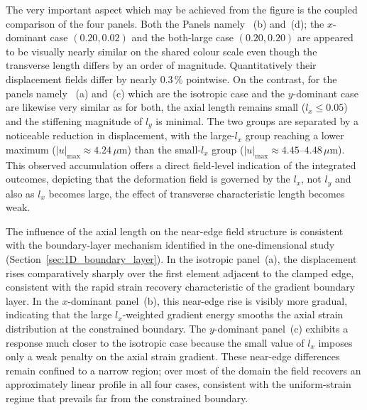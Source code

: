 \documentclass[final,3p,times,fleqn]{elsarticle}
\begin{document}
The very important aspect which may be achieved from the figure is the coupled comparison
of the four panels.
Both the Panels namely ~(b) and~(d); the $x$-dominant case $(0.20,0.02)$ and the
both-large case $(0.20,0.20)$ are appeared to be visually nearly similar on the shared colour scale even though the transverse length differs by
an order of magnitude. Quantitatively their displacement fields differ by nearly
$0.3\,\%$ pointwise.
On the contrast, for the panels namely ~(a) and~(c) which are the isotropic case and the
$y$-dominant case are likewise very similar as for both, the
axial length remains small ($l_{x}\le 0.05$) and the stiffening
magnitude of $l_{y}$ is minimal.
The two groups are separated by a noticeable reduction in displacement,
with the large-$l_{x}$ group reaching a lower maximum
($|u|_{\max}\approx 4.24\,\mu\mathrm{m}$) than the small-$l_{x}$ group
($|u|_{\max}\approx 4.45$--$4.48\,\mu\mathrm{m}$).
This observed accumulation offers a direct field-level indication of
the integrated outcomes, depicting that the deformation field is governed by the $l_{x}$, not $l_{y}$ and also as $l_{x}$ becomes large, the effect of transverse
characteristic length becomes weak.

The influence of the axial length on the near-edge field structure is
consistent with the boundary-layer mechanism identified in the
one-dimensional study (Section~\ref{sec:1D_boundary_layer}).
In the isotropic panel~(a), the displacement rises comparatively
sharply over the first element adjacent to the clamped edge, consistent
with the rapid strain recovery characteristic of the gradient boundary
layer.
In the $x$-dominant panel~(b), this near-edge rise is visibly more
gradual, indicating that the large $l_{x}$-weighted gradient energy
smooths the axial strain distribution at the constrained boundary.
The $y$-dominant panel~(c) exhibits a response much closer to the
isotropic case because the small value of $l_{x}$ imposes only a weak
penalty on the axial strain gradient.
These near-edge differences remain confined to a narrow region; over
most of the domain the field recovers an approximately linear profile
in all four cases, consistent with the uniform-strain regime that
prevails far from the constrained boundary.
\end{document}
